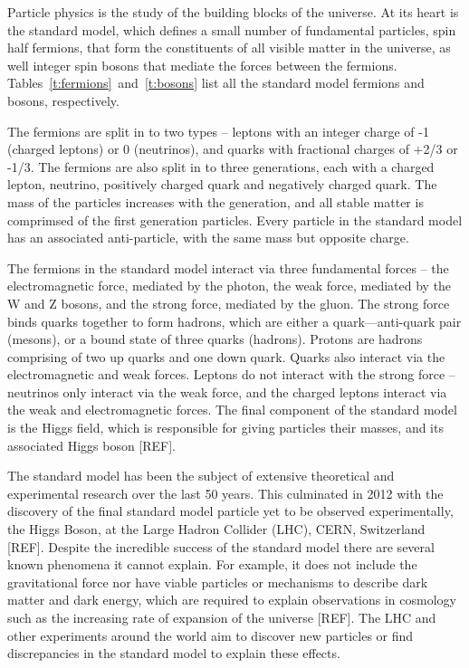

Particle physics is the study of the building blocks of the universe. At its heart is the standard model, which defines a small number of fundamental particles, spin half fermions, that form the constituents of all visible matter in the universe, as well integer spin bosons that mediate the forces between the fermions. Tables~\ref{t:fermions}~and~\ref{t:bosons} list all the standard model fermions and bosons, respectively. 

The fermions are split in to two types -- leptons with an integer charge of -1 (charged leptons) or 0 (neutrinos), and quarks with fractional charges of +2/3 or -1/3. The fermions are also split in to three generations, each with a charged lepton, neutrino, positively charged quark and negatively charged quark. The mass of the particles increases with the generation, and all stable matter is comprimsed of the first generation particles. Every particle in the standard model has an associated anti-particle, with the same mass but opposite charge. 

The fermions in the standard model interact via three fundamental forces -- the electromagnetic force, mediated by the photon, the weak force, mediated by the W and Z bosons, and the strong force, mediated by the gluon. The strong force binds quarks together to form hadrons, which are either a quark---anti-quark pair (mesons), or a bound state of three quarks (hadrons). Protons are hadrons comprising of two up quarks and one down quark. Quarks also interact via the electromagnetic and weak forces. Leptons do not interact with the strong force -- neutrinos only interact via the weak force, and the charged leptons interact via the weak and electromagnetic forces. The final component of the standard model is the Higgs field,  which is responsible for giving particles their masses, and its associated Higgs boson [REF].

The standard model has been the subject of extensive theoretical and experimental research over the last 50 years. This culminated in 2012 with the discovery of the final standard model particle yet to be observed experimentally, the Higgs Boson, at the Large Hadron Collider (LHC), CERN, Switzerland [REF]. Despite the incredible success of the standard model there are several known phenomena it cannot explain. For example, it does not include the gravitational force nor have viable particles or mechanisms to describe dark matter and dark energy, which are required to explain observations in cosmology such as the increasing rate of expansion of the universe [REF]. The LHC and other experiments around the world aim to discover new particles or find discrepancies in the standard model to explain these effects.

